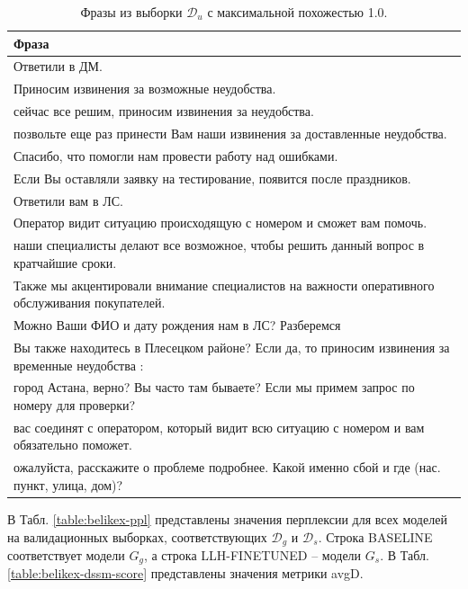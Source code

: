 \documentclass[12pt,a4paper]{amsart}
\begin{document}
\begingroup
\renewcommand{\arraystretch}{1.5}
\begin{center}
	\begin{table}[htbp]
		\caption{Фразы из выборки $ \mathcal{D}_u $ с максимальной похожестью 1.0.}
		\label{table:belikex-dssm-similar}
		\begin{tabulary}{\textwidth}{|L|}
			\hline
			Фраза\\
			\hline \hline
			Ответили в ДМ. \\
			\hline
			Приносим извинения за возможные неудобства. \\
			\hline
			сейчас все решим, приносим извинения за неудобства. \\
			\hline 
			позвольте еще раз принести Вам наши извинения за доставленные неудобства.\\
			\hline
			Спасибо, что помогли нам провести работу над ошибками. \\
			\hline
			Если Вы оставляли заявку на тестирование, появится после праздников.  \\
			\hline
			Ответили вам в ЛС. \\
			\hline
			Оператор видит ситуацию происходящую с номером и сможет вам помочь. \\
			\hline
			наши специалисты делают все возможное, чтобы решить данный вопрос в кратчайшие сроки. \\
			\hline
			Также мы акцентировали внимание специалистов на важности оперативного обслуживания покупателей. \\
			\hline
			Можно Ваши ФИО и дату рождения нам в ЛС? Разберемся \\
			\hline
			Вы также находитесь в Плесецком районе? Если да, то приносим извинения за временные неудобства :\text{(} \\
			\hline
			город Астана, верно? Вы часто там бываете? Если мы примем запрос по номеру для проверки? \\
			\hline
			вас соединят с оператором, который видит всю ситуацию с номером и вам обязательно поможет. \\
			\hline
			ожалуйста, расскажите о проблеме подробнее. Какой именно сбой и где (нас. пункт, улица, дом)? \\
			\hline
		\end{tabulary}
	\end{table}
\end{center}
\endgroup

В Табл. \ref{table:belikex-ppl} представлены значения перплексии для всех моделей на валидационных выборках, соответствующих $\mathcal{D}_g$ и $\mathcal{D}_s$. Строка BASELINE соответствует модели $G_g$, а строка LLH-FINETUNED -- модели $G_s$. В Табл. \ref{table:belikex-dssm-score} представлены значения метрики avgD.
\end{document}
